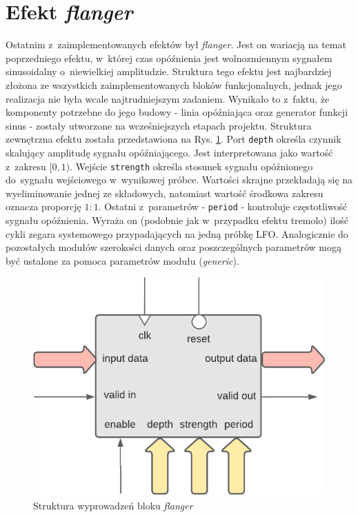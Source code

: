 \section{Efekt \textit{flanger}}

Ostatnim z~zaimplementowanych efektów był \textit{flanger}. Jest on wariacją na temat poprzedniego efektu, w~której czas opóźnienia jest wolnozmiennym sygnałem sinusoidalny o~niewielkiej amplitudzie. Struktura tego efektu jest najbardziej złożona ze wszystkich zaimplementowanych bloków funkcjonalnych, jednak jego realizacja nie była wcale najtrudniejszym zadaniem. Wynikało to z~faktu, że komponenty potrzebne do jego budowy - linia opóźniająca oraz generator funkcji sinus - zostały utworzone na wcześniejszych etapach projektu. Struktura zewnętrzna efektu została przedstawiona na Rys. \ref{flanger-structure}. Port \verb|depth| określa czynnik skalujący amplitudę sygnału opóźniającego. Jest interpretowana jako wartość z~zakresu $[0,1)$. Wejście \verb|strength| określa stosunek sygnału opóźnionego do~sygnału wejściowego w~wynikowej próbce. Wartości skrajne przekładają się na wyeliminowanie jednej ze składowych, natomiast wartość środkowa zakresu oznacza proporcję $1:1$. Ostatni z~parametrów - \verb|period| - kontroluje częstotliwość sygnału opóźnienia. Wyraża on (podobnie jak w~przypadku efektu tremolo) ilość cykli zegara systemowego przypadających na jedną próbkę LFO. Analogicznie do pozostałych modułów szerokości danych oraz poszczególnych parametrów mogą być ustalone za pomoca parametrów modułu (\textit{generic}).

\vspace{0.5cm}
\begin{figure}[ht]
    \centering
    \includegraphics[scale=0.75]{img/diagrams/flanger.pdf}
    \captionsetup{format=plain,justification=centering}
    \caption{Struktura wyprowadzeń bloku \textit{flanger}}
    \label{flanger-structure}
\end{figure}
\vspace{0.5cm}

